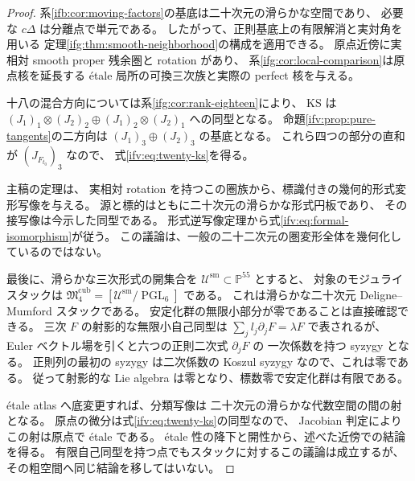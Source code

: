 \begin{proof}
系\ref{ifb:cor:moving-factors}の基底は二十次元の滑らかな空間であり、
必要な $c\Delta$ は分離点で単元である。
したがって、正則基底上の有限解消と実対角を用いる
定理\ref{ifg:thm:smooth-neighborhood}の構成を適用できる。
原点近傍に実相対 smooth proper 残余圏と rotation があり、
系\ref{ifg:cor:local-comparison}は原点核を延長する
\'etale 局所の可換三次族と実際の perfect 核を与える。

十八の混合方向については系\ref{ifg:cor:rank-eighteen}により、
KS は
$(J_1)_1\otimes(J_2)_2\oplus(J_1)_2\otimes(J_2)_1$
への同型となる。
命題\ref{ifv:prop:pure-tangents}の二方向は
$(J_1)_3\oplus(J_2)_3$ の基底となる。
これら四つの部分の直和が $(J_{F_{t_0}})_3$ なので、
式\eqref{ifv:eq:twenty-ks}を得る。

主稿の定理は、
実相対 rotation を持つこの圏族から、標識付きの幾何的形式変形写像を与える。
源と標的はともに二十次元の滑らかな形式円板であり、
その接写像は今示した同型である。
形式逆写像定理から式\eqref{ifv:eq:formal-isomorphism}が従う。
この議論は、一般の二十二次元の圏変形全体を幾何化しているのではない。

最後に、滑らかな三次形式の開集合を $\mathcal U^{\mathrm{sm}}\subset\mathbb P^{55}$ とすると、
対象のモジュライスタックは
$\mathfrak M_4^{\mathrm{cub}}=[\mathcal U^{\mathrm{sm}}/\operatorname{PGL}_6]$ である。
これは滑らかな二十次元 Deligne--Mumford スタックである。
安定化群の無限小部分が零であることは直接確認できる。
三次 $F$ の射影的な無限小自己同型は
$\sum_j l_j\partial_jF=\lambda F$ で表されるが、
Euler ベクトル場を引くと六つの正則二次式 $\partial_jF$ の
一次係数を持つ syzygy となる。
正則列の最初の syzygy は二次係数の Koszul syzygy なので、これは零である。
従って射影的な Lie algebra は零となり、標数零で安定化群は有限である。

\'etale atlas へ底変更すれば、分類写像は
二十次元の滑らかな代数空間の間の射となる。
原点の微分は式\eqref{ifv:eq:twenty-ks}の同型なので、
Jacobian 判定によりこの射は原点で \'etale である。
\'etale 性の降下と開性から、述べた近傍での結論を得る。
有限自己同型を持つ点でもスタックに対するこの議論は成立するが、
その粗空間へ同じ結論を移してはいない。
\end{proof}

